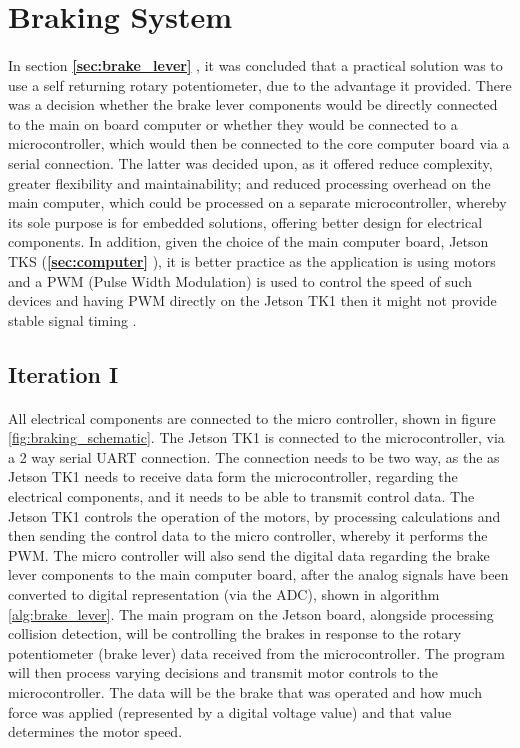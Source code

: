 \documentclass[a4paper]{report}
\begin{document}
{\section{Braking System}
\label{sec:comp_design_brakes}

\paragraph{}In section \textbf{\ref{sec:brake_lever} }, it was concluded that a practical solution was to use a self returning rotary potentiometer, due to the advantage it provided. There was a decision whether the brake lever components would be directly connected to the main on board computer or whether they would be connected to a microcontroller, which would then be connected to the core computer board via a serial connection. The latter was decided upon, as it offered reduce complexity, greater flexibility and maintainability; and reduced processing overhead on the main computer, which could be processed on a separate microcontroller, whereby its sole purpose is for embedded solutions, offering better design for electrical components. In addition, given the choice of the main computer board, Jetson TKS (\textbf{\ref{sec:computer} }), it is better practice as the application is using motors and a PWM (Pulse Width Modulation) is used to control the speed of such devices and having PWM directly on the Jetson TK1 then it might not provide stable signal timing \cite{jetson_microcontroller_support}. 

\subsection{Iteration I}

\paragraph{}All electrical components are connected to the micro controller, shown in figure \ref{fig:braking_schematic}. The Jetson TK1 is connected to the microcontroller, via a 2 way serial UART connection. The connection needs to be two way, as the as Jetson TK1 needs to receive data form the microcontroller, regarding the electrical components, and it needs to be able to transmit control data. The Jetson TK1 controls the operation of the motors, by processing calculations and then sending the control data to the micro controller, whereby it performs the PWM. The micro controller will also send the digital data regarding the brake lever components to the main computer board, after the analog signals have been converted to digital representation (via the ADC), shown in algorithm \ref{alg:brake_lever}. The main program on the Jetson board, alongside processing collision detection, will be controlling the brakes in response to the rotary potentiometer (brake lever) data received from the microcontroller. The program will then process varying decisions and transmit motor controls to the microcontroller. The data will be the brake that was operated and how much force was applied (represented by a digital voltage value) and that value determines the motor speed. 

}
\end{document}
